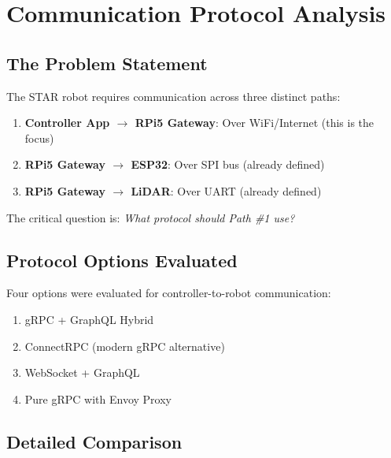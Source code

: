 \documentclass[11pt,letterpaper]{article}
\begin{document}
\section{Communication Protocol Analysis}

\subsection{The Problem Statement}

The STAR robot requires communication across three distinct paths:

\begin{enumerate}
    \item \textbf{Controller App $\rightarrow$ RPi5 Gateway}: Over WiFi/Internet (this is the focus)
    \item \textbf{RPi5 Gateway $\rightarrow$ ESP32}: Over SPI bus (already defined)
    \item \textbf{RPi5 Gateway $\rightarrow$ LiDAR}: Over UART (already defined)
\end{enumerate}

The critical question is: \textit{What protocol should Path \#1 use?}

\subsection{Protocol Options Evaluated}

Four options were evaluated for controller-to-robot communication:

\begin{enumerate}
    \item gRPC + GraphQL Hybrid
    \item ConnectRPC (modern gRPC alternative)
    \item WebSocket + GraphQL
    \item Pure gRPC with Envoy Proxy
\end{enumerate}

\subsection{Detailed Comparison}
\end{document}
